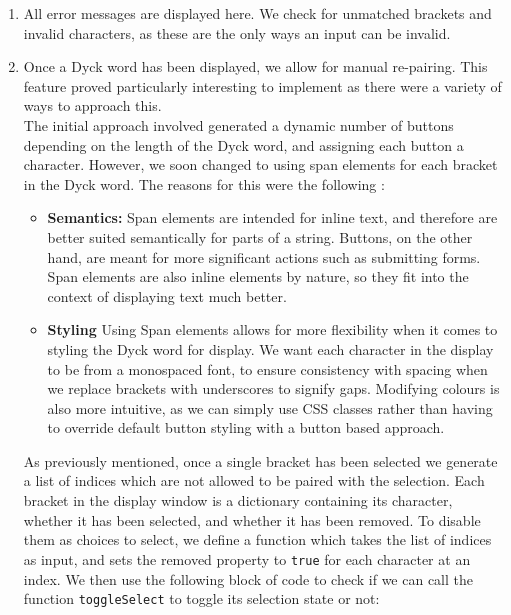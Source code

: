 \begin{enumerate}
    \item All error messages are displayed here. We check for unmatched brackets and invalid characters, as these are the only ways an input can be invalid. 
    \item Once a Dyck word has been displayed, we allow for manual re-pairing. This feature proved particularly interesting to implement as there were a variety of ways to approach this. 
    \\ The initial approach involved generated a dynamic number of buttons depending on the length of the Dyck word, and assigning each button a character. However, we soon changed to using span elements for each bracket in the Dyck word. The reasons for this were the following \cite{spanElem}:
    \begin{itemize}
        \item \textbf{Semantics:} Span elements are intended for inline text, and therefore are better suited semantically for parts of a string. Buttons, on the other hand, are meant for more significant actions such as submitting forms. Span elements are also inline elements by nature, so they fit into the context of displaying text much better.
        \item \textbf{Styling} Using Span elements allows for more flexibility when it comes to styling the Dyck word for display. We want each character in the display to be from a monospaced font, to ensure consistency with spacing when we replace brackets with underscores to signify gaps. Modifying colours is also more intuitive, as we can simply use CSS classes rather than having to override default button styling with a button based approach.
    \end{itemize}
    As previously mentioned, once a single bracket has been selected we generate a list of indices which are not allowed to be paired with the selection. Each bracket in the display window is a dictionary containing its character, whether it has been selected, and whether it has been removed. To disable them as choices to select, we define a function which takes the list of indices as input, and sets the removed property to \texttt{true} for each character at an index. We then use the following block of code to check if we can call the function \texttt{toggleSelect} to toggle its selection state or not:
    \begin{figure}[H]
        \centering

\end{figure}
\end{enumerate}

